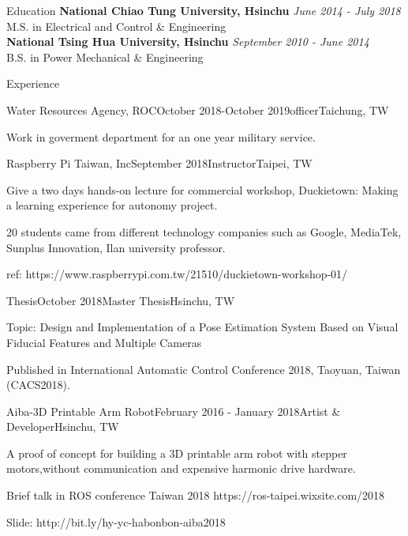 \documentclass{resume}
\begin{document}
  \begin{rSection}{Education}
    {\bf National Chiao Tung University, Hsinchu} \hfill {\em June 2014 - July 2018} \\ 
    { M.S. in Electrical and Control \& Engineering } \\

    {\bf National Tsing Hua University, Hsinchu} \hfill {\em September 2010 - June 2014} \\ 
    { B.S. in Power Mechanical \& Engineering } \\
  \end{rSection}
  
  \begin{rSection}{Experience}
  
    \begin{rSubsection}{Water Resources Agency, ROC}{October 2018-October 2019}{officer}{Taichung, TW}
    \item Work in goverment department for an one year military service. 
    \end{rSubsection}
	  
    \begin{rSubsection}{Raspberry Pi Taiwan, Inc}{September 2018}{Instructor}{Taipei, TW}
    \item Give a two days hands-on lecture for commercial workshop, Duckietown: Making a learning experience for autonomy project.
    \item 20 students came from different technology companies such as Google, MediaTek, Sunplus Innovation, Ilan university professor.
    \item ref: https://www.raspberrypi.com.tw/21510/duckietown-workshop-01/
    \end{rSubsection}
  
    \begin{rSubsection}{Thesis}{October 2018}{Master Thesis}{Hsinchu, TW}
    \item Topic:  Design and Implementation of a Pose Estimation System Based on Visual Fiducial Features and Multiple Cameras 	    
    \item Published in International Automatic Control Conference 2018, Taoyuan, Taiwan (CACS2018).
    \end{rSubsection}

    \begin{rSubsection}{Aiba-3D Printable Arm Robot}{February 2016 - January 2018}{Artist \& Developer}{Hsinchu, TW}
    \item A proof of concept for building a 3D printable arm robot with stepper motors,without communication and expensive harmonic drive hardware.
    \item Brief talk in ROS conference Taiwan 2018  https://ros-taipei.wixsite.com/2018
    \item Slide: http://bit.ly/hy-yc-habonbon-aiba2018
    \end{rSubsection}
  
  \end{rSection}
  
\end{document}
